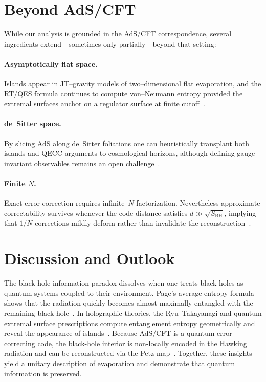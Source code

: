 \documentclass[12pt]{article}
\begin{document}
\section{Beyond AdS/CFT}\label{sec:beyond}

While our analysis is grounded in the AdS/CFT correspondence, several ingredients extend---sometimes only partially---beyond that setting:

\paragraph{Asymptotically flat space.}  Islands appear in JT--gravity models of two--dimensional flat evaporation, and the RT/QES formula continues to compute von--Neumann entropy provided the extremal surfaces anchor on a regulator surface at finite cutoff~\cite{Gautason:2023flatIslands}.

\paragraph{de~Sitter space.}  By slicing AdS along de~Sitter foliations one can heuristically transplant both islands and QECC arguments to cosmological horizons, although defining gauge--invariant observables remains an open challenge~\cite{Akers:2023dSislands}.

\paragraph{Finite $N$.}  Exact error correction requires infinite--$N$ factorization.  Nevertheless approximate correctability survives whenever the code distance satisfies $d \gg \sqrt{S_{\text{BH}}}$, implying that $1/N$ corrections mildly deform rather than invalidate the reconstruction~\cite{Hayden:2024approximate}.
\section{Discussion and Outlook}
The black-hole information paradox dissolves when one treats black holes as quantum systems coupled to their environment.  Page’s average entropy formula shows that the radiation quickly becomes almost maximally entangled with the remaining black hole~\cite{Page:1993prl}.  In holographic theories, the Ryu–Takayanagi and quantum extremal surface prescriptions compute entanglement entropy geometrically and reveal the appearance of islands~\cite{Ryu:2006prl,SciPost:2020islands}.  Because AdS/CFT is a quantum error-correcting code, the black-hole interior is non-locally encoded in the Hawking radiation and can be reconstructed via the Petz map~\cite{Penington:2019petz}.  Together, these insights yield a unitary description of evaporation and demonstrate that quantum information is preserved.
\end{document}
